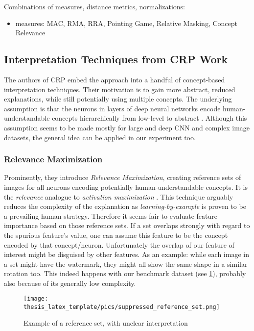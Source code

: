 Combinations of measures, distance metrics, normalizations:
\begin{itemize}
    \item measures: MAC, RMA, RRA, Pointing Game, Relative Masking, Concept Relevance
\end{itemize}

{\color{gray}
\subsection{Interpretation Techniques from CRP Work}
The authors of CRP embed the approach into a handful of concept-based interpretation techniques. Their motivation is to gain more abstract, reduced explanations, while still potentially using multiple concepts. The underlying assumption is that the neurons in layers of deep neural networks encode human-understandable concepts hierarchically from low-level to abstract \cite{Zeiler2013,Bau2017,Olah2017}. Although this assumption seems to be made mostly for large and deep CNN and complex image datasets, the general idea can be applied in our experiment too. 

\subsubsection{Relevance Maximization}
Prominently, they introduce \textit{Relevance Maximization}, creating reference sets of images for all neurons encoding potentially human-understandable concepts. It is the \textit{relevance} analogue to \textit{activation maximization} \cite{Nguyen2016}. This technique arguably reduces the complexity of the explanation as \textit{learning-by-example} is proven to be a prevailing human strategy.
Therefore it seems fair to evaluate feature importance based on those reference sets. If a set overlaps strongly with regard to the spurious feature's value, one can assume this feature to be the concept encoded by that concept/neuron. 
Unfortunately the overlap of our feature of interest might be disguised by other features. As an example: while each image in a set might have the watermark, they might all show the same shape in a similar rotation too. This indeed happens with our benchmark dataset (see \cref{fig:suppressor_ref}), probably also because of its generally low complexity. 

\begin{figure}
    \centering
    \texttt{[image: thesis\_latex\_template/pics/suppressed\_reference\_set.png]}
    \caption[Reference Set Interpretation]{Example of a reference set, with unclear interpretation}
    \label{fig:suppressor_ref}
\end{figure}

}
